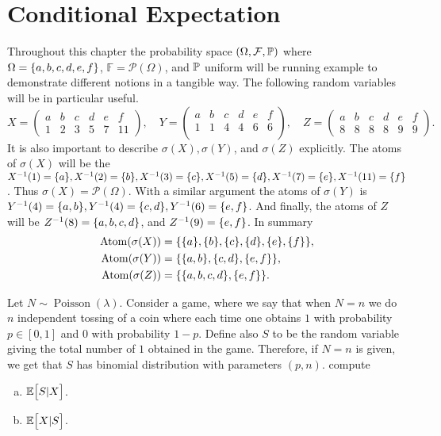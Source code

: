 \chapter{Conditional Expectation}

Throughout this chapter the probability space $ (\Omega,\mathcal{F},\mathbb{P}) $ where $ \Omega = \{a,b,c,d,e,f\} $, $ \mathbb{F} = \mathcal{P}(\Omega) $, and $ \mathbb{P} $ uniform will be running example to demonstrate different notions in a tangible way. The following random variables will be in particular useful.
\[ X = \begin{pmatrix}
	a & b & c & d & e & f \\
	1 & 2 & 3 & 5 & 7 & 11
\end{pmatrix}, \quad
Y = \begin{pmatrix}
	a & b & c & d & e & f \\
	1 & 1 & 4 & 4 & 6 & 6 \\
\end{pmatrix},\quad
Z = \begin{pmatrix}
	a & b & c & d & e & f \\
	8 & 8 & 8 & 8 & 9 & 9
\end{pmatrix}.
\]
It is also important to describe $ \sigma(X), \sigma(Y) $, and $ \sigma(Z) $ explicitly. The atoms of $ \sigma(X) $ will be the $ X^{-1}(1)=\{a\},X^{-1}(2)=\{b\},X^{-1}(3)=\{c\},X^{-1}(5)=\{d\}, X^{-1}(7)=\{e\},X^{-1}(11)=\{f\} $. Thus $ \sigma(X) = \mathcal{P}(\Omega) $. With a similar argument the atoms of $ \sigma(Y) $ is $ Y^{-1}(4) = \{a,b\}, Y^{-1}(4)=\{c,d\}, Y^{-1}(6) = \{e,f\} $. And finally, the atoms of $ Z $ will be $ Z^{-1}(8) = \{a,b,c,d\} $, and $ Z^{-1}(9) = \{e,f\} $. In summary
\begin{align*}
	\operatorname{Atom}(\sigma(X)) &= \{\{a\},\{b\},\{c\},\{d\},\{e\},\{f\}\}, \\
	\operatorname{Atom}(\sigma(Y)) &= \{\{a,b\},\{c,d\},\{e,f\}\}, \\
	\operatorname{Atom}(\sigma(Z)) &= \{\{a,b,c,d\},\{e,f\}\}.
\end{align*}


\begin{example}
	Let $ N \sim \operatorname{Poisson}(\lambda) $. Consider a game, where we say that when $ N = n $ we do $ n $ independent tossing of a coin where each time one obtains $ 1 $ with probability $ p \in[0,1] $ and $ 0 $ with probability $ 1-p $. Define also $ S $ to be the random variable giving the total number of $ 1 $ obtained in the game. Therefore, if $ N = n $ is given, we get that $ S $ has binomial distribution with parameters $ (p,n) $. compute
	\begin{enumerate}[(a)]
		\item $ \mathbb{E}\big[S | X\big] $.
		\item $ \mathbb{E}\big[X | S\big] $.
	\end{enumerate}
\end{example}